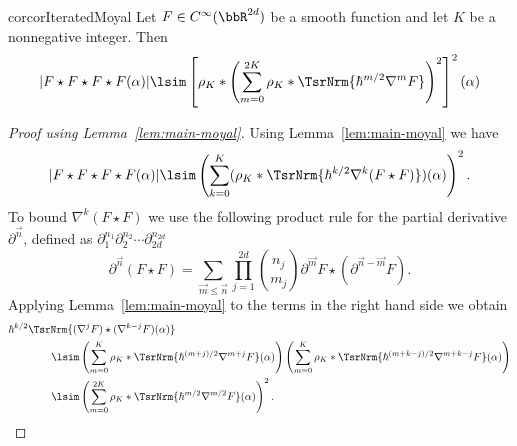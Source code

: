 \documentclass{article}
\numberwithin{equation}{section}
\begin{document}
\begin{restatable}{cor}{corIteratedMoyal}
	\label{cor:iterated-moyal}
	Let $F\in C^\infty(\bbR^{2d})$ be a smooth function and let $K$ be a nonnegative integer.
	Then
	\begin{equation}
	|F\star F \star F \star F (\alpha)| \lsim\left[\rho_K \ast
	\left(\sum_{m=0}^{2K} \rho_K \ast \TsrNrm{\hbar^{m/2}\nabla^{m} F}\right)^2\right]^2(\alpha)
	\end{equation}
\end{restatable}
\begin{proof}[Proof using Lemma~\ref{lem:main-moyal}]
 Using Lemma~\ref{lem:main-moyal} we have
	\[
	|F\star F \star F\star F(\alpha)|
	\lsim\left(\sum_{k=0}^K (\rho_K \ast \TsrNrm{\hbar^{k/2}\nabla^k (F\star F)})(\alpha) \right)^2.
	\]
	To bound $\nabla^k (F\star F)$ we use the following product rule for the
	partial derivative $\partial^{\vec{n}}$, defined as 
$\partial_1^{n_1}\partial_2^{n_2}\cdots\partial_{2d}^{n_{2d}}$
	\[
	\partial^{\vec{n}} (F\star F) = 
	\sum_{\vec{m}\leq\vec{n}} \prod_{j=1}^{2d} \binom{n_j}{m_j} \partial^{\vec{m}} F\star 
	(\partial^{\vec{n}-\vec{m}} F).
	\]
	Applying Lemma~\ref{lem:main-moyal} to the terms in the right hand side we obtain
	\begin{equation}
		\begin{split}
			&\hbar^{k/2}
			\TsrNrm{(\nabla^j F)\star (\nabla^{k-j} F) (\alpha)}\\
			&\qquad\qquad \lsim
			\left(\sum_{m=0}^K \rho_K \ast \TsrNrm{\hbar^{(m+j)/2} \nabla^{m+j} F} (\alpha)\right)
			\left(\sum_{m=0}^K \rho_K \ast \TsrNrm{\hbar^{(m+k-j)/2} \nabla^{m+k-j} F} (\alpha)\right) \\
			&\qquad\qquad \lsim \left(\sum_{m=0}^{2K} \rho_K \ast \TsrNrm{\hbar^{m/2} \nabla^{m/2} F}(\alpha)\right)^2.
		\end{split}
	\end{equation}
\end{proof}
\end{document}
